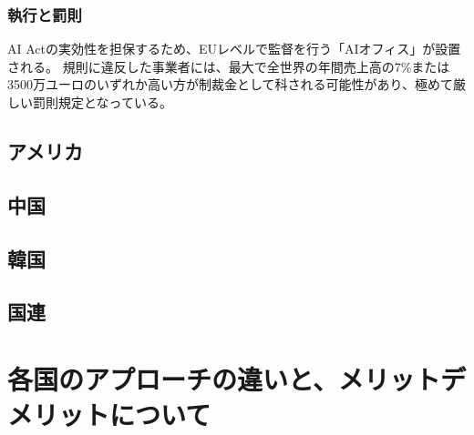 \subsubsection{執行と罰則}

AI Actの実効性を担保するため、EUレベルで監督を行う「AIオフィス」が設置される。
規則に違反した事業者には、最大で全世界の年間売上高の7\%または3500万ユーロのいずれか高い方が制裁金として科される可能性があり、極めて厳しい罰則規定となっている。

\subsection{アメリカ}

\subsection{中国}

\subsection{韓国}

\subsection{国連}

\section{各国のアプローチの違いと、メリットデメリットについて}

